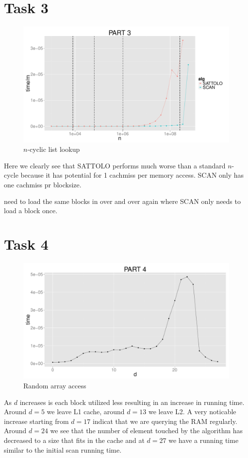 \documentclass{article}
\begin{document}
\section*{Task 3}
\begin{figure}[H]
    \centering
    \includegraphics[width=\textwidth]{images/part3.pdf}
    \caption{$n$-cyclic list lookup}
    \label{fig:awesome_image}
\end{figure}

Here we clearly see that SATTOLO performs much worse than a standard $n$-cycle 
because it has potential for 1 cachmiss per memory access. SCAN only has one 
cachmiss pr blocksize. 

need to load the same blocks in over and over again where SCAN
only needs to load a block once.
\section*{Task 4}
\begin{figure}[H]
    \centering
    \includegraphics[width=\textwidth]{images/part4.pdf}
    \caption{Random array access}
    \label{fig:awesome_image}
\end{figure}
As $d$ increases is each block utilized less resulting in an increase in running 
time. Around $d=5$ we leave L1 cache, around $d=13$ we leave L2. A very 
noticable increase starting from $d=17$ indicat that we are querying the RAM 
regularly. Around $d=24$ we see that the number of element touched by the 
algorithm has decreased to a size that fits in the cache and at $d=27$ we have a 
running time similar to the initial scan running time.  
\end{document}
